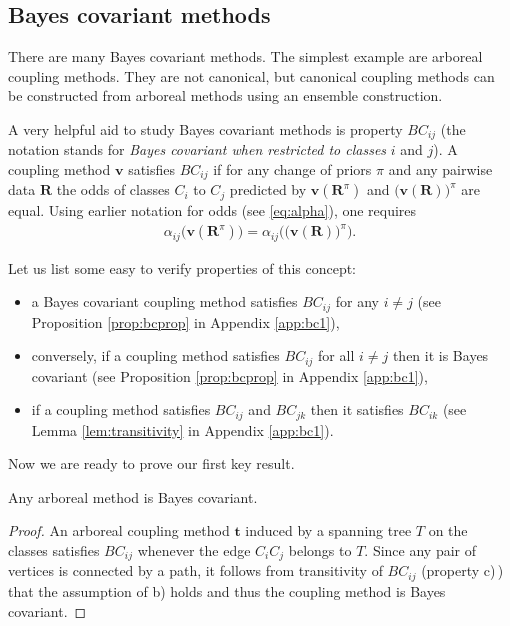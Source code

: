 \subsection{Bayes covariant methods} \label{sec:bc2}

There are many Bayes covariant methods. The simplest example are arboreal coupling methods. They are not canonical, but canonical coupling methods can be constructed from arboreal methods using an ensemble construction. 

A very helpful aid to study Bayes covariant methods is property $BC_{ij}$ (the notation stands for \emph{Bayes covariant when restricted to classes} $i$ and $j$). A coupling method $\boldsymbol{v}$ satisfies $BC_{ij}$ if for any change of priors $\pi$ and any  pairwise data $\boldsymbol{R}$ the odds of classes $C_i$ to $C_j$ predicted by $\boldsymbol{v}(\boldsymbol{R}^\pi)$ and $\bigl(\boldsymbol{v}(\boldsymbol{R})\bigr)^\pi$ are equal. Using earlier notation for odds (see \eqref{eq:alpha}), one requires
\begin{align}
	\alpha_{ij} \bigl(\boldsymbol{v}(\boldsymbol{R}^\pi) \bigr) = \alpha_{ij}\biggl( \bigl(\boldsymbol{v}(\boldsymbol{R}) \bigr)^\pi\biggr).
\end{align}

Let us list some easy to verify properties of this concept:

\begin{itemize}
	\item[(a)] a Bayes covariant coupling method satisfies $BC_{ij}$ for any $i\not= j$ (see Proposition \ref{prop:bcprop} in Appendix \ref{app:bc1}),
	\item[(b)] conversely, if a coupling method satisfies $BC_{ij}$ for all $i\not= j$ then it is Bayes covariant (see Proposition \ref{prop:bcprop} in Appendix \ref{app:bc1}),
	\item[(c)] if a coupling method satisfies $BC_{ij}$ and $BC_{jk}$ then it satisfies $BC_{ik}$ (see Lemma \ref{lem:transitivity} in Appendix \ref{app:bc1}).
\end{itemize}

Now we are ready to prove  our first key result.

\begin{prop}
Any arboreal method is Bayes covariant.
\end{prop}
\begin{proof}

An arboreal coupling method $\boldsymbol{t}$ induced by a spanning tree $T$ on the classes satisfies $BC_{ij}$ whenever the edge $C_iC_j$ belongs to $T$. Since any pair of vertices is connected by a path, it follows from transitivity of $BC_{ij}$ (property c)\,) that the assumption of b) holds and thus the coupling method is Bayes covariant.
	
\end{proof}

